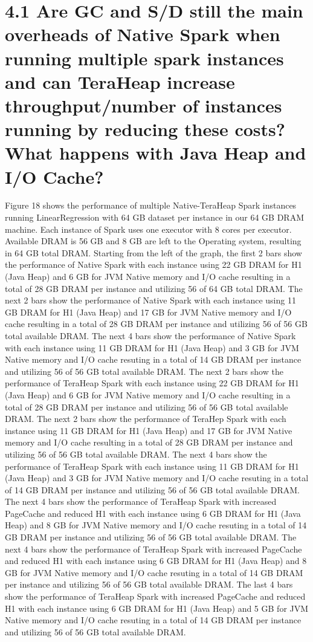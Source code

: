\documentclass[twocolumn,10pt]{asme2e}
\begin{document}
\section*{4.1 Are GC and S/D still the main overheads of Native Spark when running multiple spark instances and can TeraHeap increase throughput/number of instances running by reducing these costs? What happens with Java Heap and I/O Cache?}

Figure 18 shows the performance of multiple Native-TeraHeap Spark instances running LinearRegression with 64 GB dataset per instance in our 64 GB DRAM machine. Each instance of Spark uses one executor with 8 cores per executor. Available DRAM is 56 GB and 8 GB are left to the Operating system, resulting in 64 GB total DRAM. Starting from the left of the graph, the first 2 bars show the performance of Native Spark with each instance using 22 GB DRAM for H1 (Java Heap) and 6 GB for JVM Native memory and I/O cache resulting in a total of 28 GB DRAM per instance and utilizing 56 of 64 GB total DRAM. The next 2 bars show the performance of Native Spark with each instance using 11 GB DRAM for H1 (Java Heap) and 17 GB for JVM Native memory and I/O cache resulting in a total of 28 GB DRAM per instance and utilizing 56 of 56 GB total available DRAM. The next 4 bars show the performance of Native Spark with each instance using 11 GB DRAM for H1 (Java Heap) and 3 GB for JVM Native memory and I/O cache resuting in a total of 14 GB DRAM per instance and utilizing 56 of 56 GB total available DRAM. 
The next 2 bars show the performance of TeraHeap Spark with each instance using 22 GB DRAM for H1 (Java Heap) and 6 GB for JVM Native memory and I/O cache resulting in a total of 28 GB DRAM per instance and utilizing 56 of 56 GB total available DRAM. The next 2 bars show the performance of TeraHep Spark with each instance using 11 GB DRAM for H1 (Java Heap) and 17 GB for JVM Native memory and I/O cache resulting in a total of 28 GB DRAM per instance and utilizing 56 of 56 GB total available DRAM. The next 4 bars show the performance of TeraHeap Spark with each instance using 11 GB DRAM for H1 (Java Heap) and 3 GB for JVM Native memory and I/O cache resuting in a total of 14 GB DRAM per instance and utilizing 56 of 56 GB total available DRAM. The next 4 bars show the performance of TeraHeap Spark with increased PageCache and reduced H1 with each instance using 6 GB DRAM for H1 (Java Heap) and 8 GB for JVM Native memory and I/O cache resuting in a total of 14 GB DRAM per instance and utilizing 56 of 56 GB total available DRAM. The next 4 bars show the performance of TeraHeap Spark with increased PageCache and reduced H1 with each instance using 6 GB DRAM for H1 (Java Heap) and 8 GB for JVM Native memory and I/O cache resuting in a total of 14 GB DRAM per instance and utilizing 56 of 56 GB total available DRAM. The last 4 bars show the performance of TeraHeap Spark with increased PageCache and reduced H1 with each instance using 6 GB DRAM for H1 (Java Heap) and 5 GB for JVM Native memory and I/O cache resuting in a total of 14 GB DRAM per instance and utilizing 56 of 56 GB total available DRAM.
\end{document}
